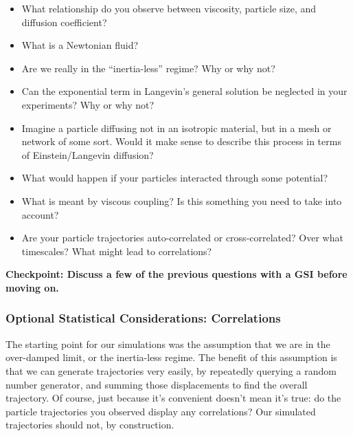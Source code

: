 \documentclass{../lab}
\begin{document}
\begin{itemize}
    \item What relationship do you observe between viscosity, particle size, and diffusion coefficient?

    \item What is a Newtonian fluid?

    \item Are we really in the ``inertia-less'' regime? Why or why not?

    \item Can the exponential term in Langevin's general solution be neglected in your experiments? Why or why not?

    \item Imagine a particle diffusing not in an isotropic material, but in a mesh or network of some sort. Would it make sense to describe this process in terms of Einstein/Langevin diffusion?

    \item What would happen if your particles interacted through some potential?

    \item What is meant by viscous coupling? Is this something you need to take into account?

    \item Are your particle trajectories auto-correlated or cross-correlated? Over what timescales? What might lead to correlations?
\end{itemize}

\textbf{Checkpoint: Discuss a few of the previous questions with a GSI before moving on.}

\subsubsection{Optional Statistical Considerations: Correlations}

The starting point for our simulations was the assumption that we are in the over-damped limit, or the inertia-less regime. The benefit of this assumption is that we can generate trajectories very easily, by repeatedly querying a random number generator, and summing those displacements to find the overall trajectory. Of course, just because it's convenient doesn't mean it's true: do the particle trajectories you observed display any correlations? Our simulated trajectories should not, by construction.
\end{document}
